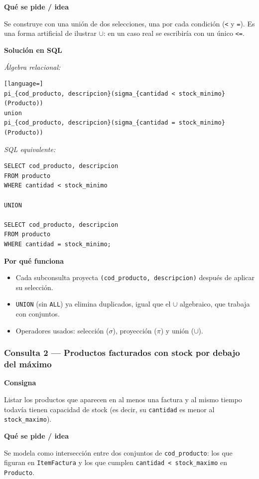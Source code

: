 \documentclass[11pt,a4paper]{article}
\newcommand{\itemcabecera}[1]{\noindent\textbf{#1}\par\medskip}
\newcommand{\bloqueConsigna}{\itemcabecera{Consigna}}
\newcommand{\bloqueIdea}{\itemcabecera{Qu\'e se pide / idea}}
\newcommand{\bloqueSolucion}{\itemcabecera{Soluci\'on en SQL}}
\newcommand{\bloquePorque}{\itemcabecera{Por qu\'e funciona}}
\begin{document}
\bloqueIdea

Se construye con una unión de dos selecciones, una por cada condición (\texttt{<} y \texttt{=}). Es una forma artificial de ilustrar $\cup$: en un caso real se escribiría con un único \texttt{<=}.

\bloqueSolucion

\textit{Álgebra relacional:}

\begin{lstlisting}[language=]
pi_{cod_producto, descripcion}(sigma_{cantidad < stock_minimo}(Producto))
union
pi_{cod_producto, descripcion}(sigma_{cantidad = stock_minimo}(Producto))
\end{lstlisting}

\textit{SQL equivalente:}

\begin{lstlisting}
SELECT cod_producto, descripcion
FROM producto
WHERE cantidad < stock_minimo

UNION

SELECT cod_producto, descripcion
FROM producto
WHERE cantidad = stock_minimo;
\end{lstlisting}

\bloquePorque

\begin{itemize}
    \item Cada subconsulta proyecta \texttt{(cod\_producto, descripcion)} después de aplicar su selección.
    \item \texttt{UNION} (sin \texttt{ALL}) ya elimina duplicados, igual que el $\cup$ algebraico, que trabaja con conjuntos.
    \item Operadores usados: selección ($\sigma$), proyección ($\pi$) y unión ($\cup$).
\end{itemize}

\subsubsection*{Consulta 2 --- Productos facturados con stock por debajo del máximo}

\bloqueConsigna

Listar los productos que aparecen en al menos una factura y al mismo tiempo todavía tienen capacidad de stock (es decir, su \texttt{cantidad} es menor al \texttt{stock\_maximo}).

\bloqueIdea

Se modela como intersección entre dos conjuntos de \texttt{cod\_producto}: los que figuran en \texttt{ItemFactura} y los que cumplen \texttt{cantidad < stock\_maximo} en \texttt{Producto}.
\end{document}

